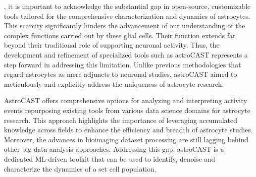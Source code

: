 
, it is important to acknowledge the substantial gap in open-source, customizable tools tailored for the comprehensive characterization and dynamics of astrocytes. This scarcity significantly hinders the advancement of our understanding of the complex functions carried out by these glial cells. Their function extends far beyond their traditional role of supporting neuronal activity\citep{montalant_role_2021,ransom_new_2003}. Thus, the development and refinement of specialized tools such as astroCAST represents a step forward in addressing this limitation. Unlike previous methodologies that regard astrocytes as mere adjuncts to neuronal studies, astroCAST aimed to meticulously and explicitly address the uniqueness of astrocyte research.

AstroCAST offers comprehensive options for analyzing and interpreting activity events repurposing existing tools from various data science domains for astrocyte research. This approach highlights the importance of leveraging accumulated knowledge across fields to enhance the efficiency and breadth of astrocyte studies. Moreover, the advances in bioimaging dataset processing are still lagging behind other big data analysis approaches. Addressing this gap, astroCAST is a dedicated ML-driven toolkit that can be used to identify, denoise and characterize the dynamics of a set cell population.


